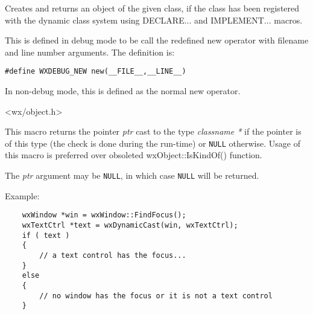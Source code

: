 
Creates and returns an object of the given class, if the class has been
registered with the dynamic class system using DECLARE... and IMPLEMENT... macros.


\label{debugnew}


This is defined in debug mode to be call the redefined new operator
with filename and line number arguments. The definition is:

\begin{verbatim}
#define WXDEBUG_NEW new(__FILE__,__LINE__)
\end{verbatim}

In non-debug mode, this is defined as the normal new operator.


<wx/object.h>


\label{wxdynamiccast}


This macro returns the pointer {\it ptr} cast to the type {\it classname *} if
the pointer is of this type (the check is done during the run-time) or
{\tt NULL} otherwise. Usage of this macro is preferred over obsoleted
wxObject::IsKindOf() function.

The {\it ptr} argument may be {\tt NULL}, in which case {\tt NULL} will be
returned.

Example:

\begin{verbatim}
    wxWindow *win = wxWindow::FindFocus();
    wxTextCtrl *text = wxDynamicCast(win, wxTextCtrl);
    if ( text )
    {
        // a text control has the focus...
    }
    else
    {
        // no window has the focus or it is not a text control
    }
\end{verbatim}


\\
\\
\\


\label{wxdynamiccastthis}

